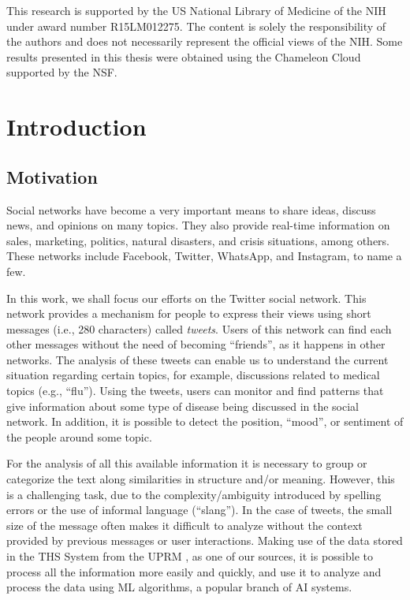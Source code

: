 \documentclass[12pt]{report}
\begin{document}
This research is supported by the \ac{US} National Library of Medicine of the \ac{NIH} under award number R15LM012275. The content is solely the responsibility of the authors and does not necessarily represent the official views of the \ac{NIH}. Some results presented in this thesis were obtained using the Chameleon Cloud supported by the \ac{NSF}.
\vfill
\doublespacing

\tableofcontents{}

\newpage
\printacronyms[include-classes=abbrev,name=List of Abbreviations]
\newpage
\listoffigures{}
\newpage
\listoftables{}

\newpage
{}

\fancyhf{}
\fancyhead[R]{\thepage} 
\renewcommand{\figurename}{Fig}
\onehalfspacing
\chapter{Introduction}\label{Chapter 1}
\doublespacing

\section{Motivation}
	Social networks have become a very important means to share ideas, discuss news, and opinions on many topics.  They also provide real-time information on sales, marketing, politics, natural disasters, and crisis situations, among others. These networks include Facebook, Twitter, WhatsApp, and Instagram, to name a few. 
	
	In this work, we shall focus our efforts on the Twitter social network. This network provides a mechanism for people to express their views using short messages (i.e., 280 characters)
	called {\em tweets}. 
	Users of this network can find each other messages without the need of becoming ``friends'', as it happens in other networks. The analysis of these tweets can enable us to understand the current situation regarding certain topics, for example, discussions related to medical topics (e.g., ``flu'').
	Using the tweets, users can monitor and find patterns that give information about some type of disease being discussed in the social network. In addition, it is possible to detect the position,
	``mood'', or sentiment of the people around some topic.
	
	For the analysis of all this available information it is necessary to group or categorize the text along similarities in structure and/or meaning. However, this is a challenging task, due to the complexity/ambiguity introduced by  spelling errors or the use of informal language (``slang'').  In the case of tweets, the small size of the message often makes it difficult to analyze without the context provided by previous messages or user interactions. Making use of the data stored in the  \ac{THS} System from the \ac{UPRM} , as one of our sources, it is possible to process all the information more easily and quickly, and use it to analyze and process the data using  \ac{ML} algorithms, a popular branch of \ac{AI} systems.
	
\end{document}
